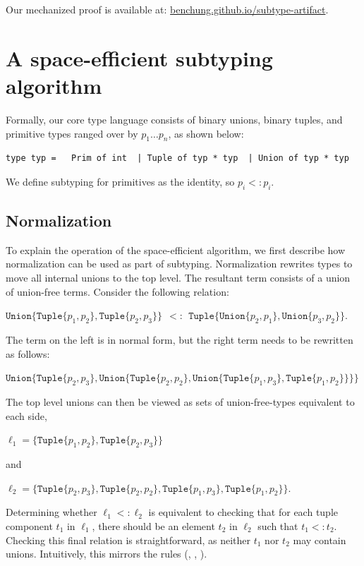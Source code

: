 \documentclass[a4paper,english]{lipics-v2019}
\newcommand{\xt}[1]{\texttt{#1}}
\newcommand{\union}[2]{\xt{Union\{}#1,#2\xt{\}}}
\newcommand{\tuple}[1]{\xt{Tuple\{}#1\xt{\}}}
\begin{document}
\medskip
Our mechanized proof is available at: {\small\url{benchung.github.io/subtype-artifact}}.


\section{A space-efficient subtyping algorithm}

Formally, our core type language consists of binary unions, binary tuples, and
primitive types ranged over by $p_1 \dots p_n$, as shown below:

\medskip
\begin{lstlisting}
type typ =   Prim of int  | Tuple of typ * typ  | Union of typ * typ
\end{lstlisting}
\medskip

\noindent
We define subtyping for primitives as the identity, so $p_i <: p_i$.

\subsection{Normalization}\label{normalize}

To explain the operation of the space-efficient algorithm, we first
describe how normalization can be used as part of subtyping. Normalization
rewrites types to move all internal unions to the top level. The resultant
term consists of a union of union-free terms. Consider the following
relation:

\medskip
$\union{ \tuple{p_1,p_2}}{\tuple{p_2,p_3}} ~~ <:~~  \tuple{ \union{p_2}{p_1}, \union{p_3}{p_2}}$.
\medskip

\noindent
The term on the left is in normal form, but the right term  needs to be
rewritten as follows:

\medskip
$\union{ \tuple{p_2,p_3}}
  {\union{ \tuple{p_2,p_2}}
    {\union{ \tuple{p_1,p_3}}
           {\tuple{p_1,p_2}}}}$
\medskip

\noindent
The top level unions can then be viewed as sets of union-free-types
equivalent to each side,

\medskip
$\ell_1 = \{  \tuple{p_1,p_2}, \tuple{p_2,p_3}  \}$
\medskip

\noindent and

\medskip
$\ell_2 = \{  \tuple{p_2,p_3}, \tuple{p_2,p_2}, \tuple{p_1,p_3}, 
          \tuple{p_1,p_2} \}$.
\medskip

\noindent Determining whether $\ell_1 <: \ell_2$ is equivalent to checking that for each tuple component $t_1$ in $\ell_1$, there should be an element $t_2$ in $\ell_2$ such
that $t_1 <: t_2$. Checking this final relation is straightforward, as neither
$t_1$ nor $t_2$ may contain unions. Intuitively, this mirrors the 
rules ({\sc [allexist]}, {\sc [existL/R]}, {\sc [tuple]}). 
\end{document}
